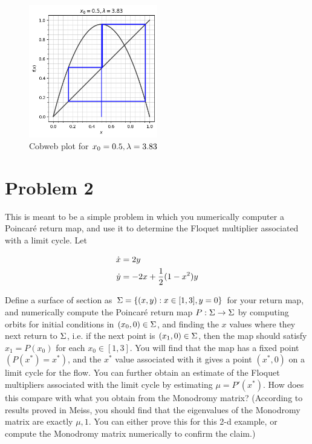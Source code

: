\begin{figure}
    \centering
    \includegraphics[width = 0.5\textwidth]{Images/cobwek plot.png}
    \caption{Cobweb plot for $x_0 = 0.5, \lambda = 3.83$}
    \label{fig:enter-label}
\end{figure}

\clearpage
\newpage
\section{Problem 2}
This is meant to be a simple problem in which you numerically computer a Poincar\'e return map, and use it to determine the Floquet multiplier associated with a limit cycle. Let

\begin{align}
    \dot{x} &= 2y\nonumber\\
    \dot{y} &= -2x + \frac{1}{2}(1 - x^2)y\nonumber
\end{align}

Define a surface of section as $\Sigma = \{(x, y) : x \in [1, 3], y = 0\}$ for your return map, and numerically compute the Poincar\'e return map $P: \Sigma \rightarrow \Sigma $ by computing orbits for initial conditions in $(x_0, 0) \in \Sigma$, and finding the $x$ values where they next return to $\Sigma$, i.e. if the next point is $(x_1, 0) \in \Sigma$, then the map should satisfy $x_1 = P(x_0)$ for each $x_0 \in [1, 3]$. You will find that the map has a fixed point $(P(x^*) = x^*)$, and the $x^*$ value associated with it gives a point $(x^*, 0)$ on a limit cycle for the flow. You can further obtain an estimate of the Floquet multipliers associated with the limit cycle by estimating $\mu = P'(x^*)$. How does this compare with what you obtain from the Monodromy matrix? (According to results proved in Meiss, you should find that the eigenvalues of the Monodromy matrix are exactly $\mu, 1$. You can either prove this for this 2-d example, or compute the Monodromy matrix numerically to confirm the claim.)

